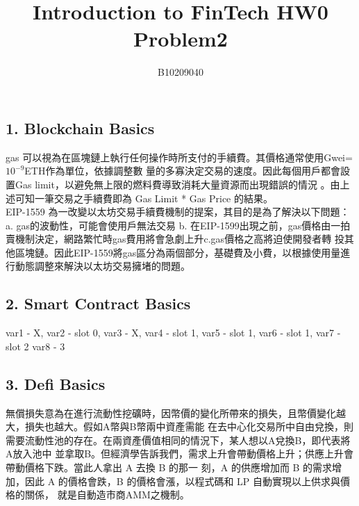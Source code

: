\documentclass{article}
\title{Introduction to FinTech HW0 Problem2}
\author{B10209040\quad陳彥倫}
\begin{document}
\begin{CJK*}{UTF8}{bsmi}
\maketitle

\begin{spacing}{2}
    \subsection*{1. Blockchain Basics}
    gas 可以視為在區塊鏈上執行任何操作時所支付的手續費。其價格通常使用Gwei=$10^{-9}$ETH作為單位，依據調整數
    量的多寡決定交易的速度。因此每個用戶都會設置Gas limit，以避免無上限的燃料費導致消耗大量資源而出現錯誤的情況
    。由上述可知一筆交易之手續費即為 Gas Limit * Gas Price 的結果。\\
    EIP-1559 為一改變以太坊交易手續費機制的提案，其目的是為了解決以下問題：a. gas的波動性，可能會使用戶無法交易
    b. 在EIP-1599出現之前，gas價格由一拍賣機制決定，網路繁忙時gas費用將會急劇上升c.gas價格之高將迫使開發者轉
    投其他區塊鏈。因此EIP-1559將gas區分為兩個部分，基礎費及小費，以根據使用量進行動態調整來解決以太坊交易擁堵的問題。
\end{spacing}

\begin{spacing}{2}
    \subsection*{2. Smart Contract Basics} 
    var1 - X, var2 - slot 0, var3 - X, var4 - slot 1, var5 - slot 1, var6 - slot 1, var7 - slot 2
    var8 - 3
\end{spacing}

\begin{spacing}{2}
    \subsection*{3. Defi Basics} 
    無償損失意為在進行流動性挖礦時，因幣價的變化所帶來的損失，且幣價變化越大，損失也越大。假如A幣與B幣兩中資產需能
    在去中心化交易所中自由兌換，則需要流動性池的存在。在兩資產價值相同的情況下，某人想以A兌換B，即代表將A放入池中
    並拿取B。但經濟學告訴我們，需求上升會帶動價格上升；供應上升會帶動價格下跌。當此人拿出 A 去換 B 的那一
    刻，A 的供應增加而 B 的需求增加，因此 A 的價格會跌，B 的價格會漲，以程式碼和 LP 自動實現以上供求與價格的關係，
    就是自動造市商AMM之機制。
    
\end{spacing}


\end{CJK*}
\end{document}
